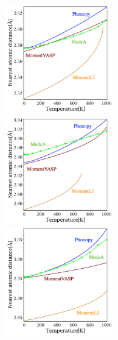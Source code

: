 \documentclass[10pt,twocolumn,a4j]{jsarticle}
\begin{document}

\begin{figure}[htb]
\begin{minipage}{0.245\hsize}
\begin{center}
\includegraphics[width=4.7cm]{./image_result/Cu_lat_label.eps}
\end{center}
\end{minipage}
\begin{minipage}{0.245\hsize}
\begin{center}
\includegraphics[width=4.7cm]{./image_result/Ag_lat_label.eps}
\end{center}
\end{minipage}
 \begin{minipage}{0.245\hsize}
\begin{center}
\includegraphics[width=4.7cm]{./image_result/Au_lat_label.eps}

\end{center}
\end{minipage}
\end{figure}
\end{document}
